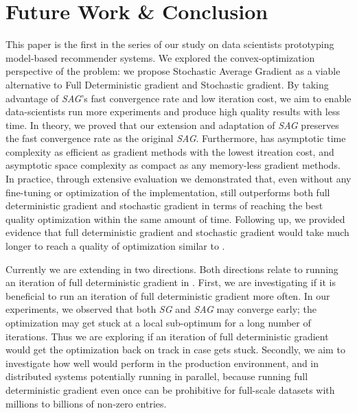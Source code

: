 \section{Future Work \& Conclusion}
This paper is the first in the series of our study on data scientists prototyping model-based recommender systems.  
We explored the convex-optimization perspective of the problem: we propose Stochastic Average Gradient as a viable alternative to Full Deterministic gradient and Stochastic gradient.  
By taking advantage of \emph{SAG}'s fast convergence rate and low iteration cost, we aim to enable data-scientists run more experiments and produce high quality results with less time.  
In theory, we proved that our extension and adaptation of \emph{SAG} preserves the fast convergence rate as the original \emph{SAG}.  
Furthermore, \tool has asymptotic time complexity as efficient as gradient methods with the lowest itreation cost, and asymptotic space complexity as compact as any memory-less gradient methods.  
In practice, through extensive evaluation we demonstrated that, even without any fine-tuning or optimization of the implementation, 
\tool still outperforms both full deterministic gradient and stochastic gradient in terms of reaching the best quality optimization within the same amount of time.  
Following up, we provided evidence that full deterministic gradient and stochastic gradient would take much longer to reach a quality of optimization similar to \tool.

Currently we are extending \tool in two directions.  Both directions relate to running an iteration of full deterministic gradient in \tool.
First, we are investigating if it is beneficial to run an iteration of full deterministic gradient more often.  
In our experiments, we observed that both \emph{SG} and \emph{SAG} may converge early; the optimization may get stuck at a local sub-optimum for a long number of iterations.  
Thus we are exploring if an iteration of full deterministic gradient would get the optimization back on track in case \tool gets stuck.
Secondly, we aim to investigate how well \tool would perform in the production environment, and in distributed systems potentially running in parallel, because running full deterministic gradient even once can be prohibitive for full-scale datasets with millions to billions of non-zero entries.

